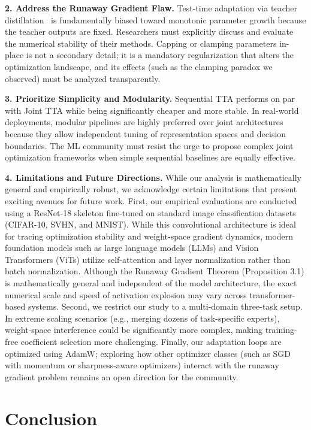 \documentclass{article}
\theoremstyle{plain}
\theoremstyle{definition}
\theoremstyle{remark}
\begin{document}
\textbf{2. Address the Runaway Gradient Flaw.}
Test-time adaptation via teacher distillation~\cite{hinton2015distilling, symerge} is fundamentally biased toward monotonic parameter growth because the teacher outputs are fixed. Researchers must explicitly discuss and evaluate the numerical stability of their methods. Capping or clamping parameters in-place is not a secondary detail; it is a mandatory regularization that alters the optimization landscape, and its effects (such as the clamping paradox we observed) must be analyzed transparently.

\textbf{3. Prioritize Simplicity and Modularity.}
Sequential TTA performs on par with Joint TTA while being significantly cheaper and more stable. In real-world deployments, modular pipelines are highly preferred over joint architectures because they allow independent tuning of representation spaces and decision boundaries. The ML community must resist the urge to propose complex joint optimization frameworks when simple sequential baselines are equally effective.

\textbf{4. Limitations and Future Directions.}
While our analysis is mathematically general and empirically robust, we acknowledge certain limitations that present exciting avenues for future work. First, our empirical evaluations are conducted using a ResNet-18 skeleton fine-tuned on standard image classification datasets (CIFAR-10, SVHN, and MNIST). While this convolutional architecture is ideal for tracing optimization stability and weight-space gradient dynamics, modern foundation models such as large language models (LLMs) and Vision Transformers (ViTs) utilize self-attention and layer normalization rather than batch normalization. Although the Runaway Gradient Theorem (Proposition 3.1) is mathematically general and independent of the model architecture, the exact numerical scale and speed of activation explosion may vary across transformer-based systems. Second, we restrict our study to a multi-domain three-task setup. In extreme scaling scenarios (e.g., merging dozens of task-specific experts), weight-space interference could be significantly more complex, making training-free coefficient selection more challenging. Finally, our adaptation loops are optimized using AdamW; exploring how other optimizer classes (such as SGD with momentum or sharpness-aware optimizers) interact with the runaway gradient problem remains an open direction for the community.


\section{Conclusion}
\label{sec:conclusion}
\end{document}
